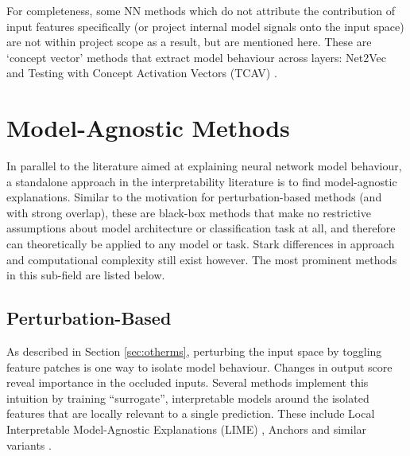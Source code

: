 \documentclass[main]{subfiles}
\begin{document}





For completeness, some NN methods which do not attribute the contribution of input features specifically (or project internal model signals onto the input space) are not within project scope as a result, but are mentioned here. These are `concept vector' methods that extract model behaviour across layers: Net2Vec \cite{net2vec} and Testing with Concept Activation Vectors (TCAV) \cite{tcav}.





\section{Model-Agnostic Methods} \label{sec:modelag}

In parallel to the literature aimed at explaining neural network model behaviour, a standalone approach in the interpretability literature is to find model-agnostic explanations. Similar to the motivation for perturbation-based methods (and with strong overlap), these are black-box methods that make no restrictive assumptions about model architecture or classification task at all, and therefore can theoretically be applied to any model or task. Stark differences in approach and computational complexity still exist however. The most prominent methods in this sub-field are listed below.


\subsection{Perturbation-Based} \label{sec:perturbag}
As described in Section \ref{sec:otherms}, perturbing the input space by toggling feature patches is one way to isolate model behaviour. Changes in output score reveal importance in the occluded inputs. Several methods implement this intuition by training ``surrogate'', interpretable models around the isolated features that are locally relevant to a single prediction. These include Local Interpretable Model-Agnostic Explanations (LIME) \cite{lime}, Anchors \cite{anchors} and similar variants \cite{local}.
\end{document}

